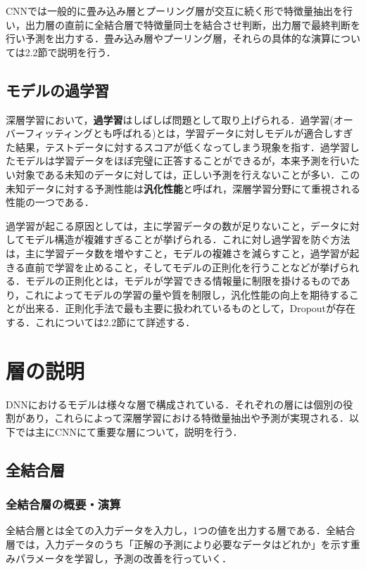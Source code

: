 \documentclass[a4j, 11pt]{jreport}
\begin{document}
CNNでは一般的に畳み込み層とプーリング層が交互に続く形で特徴量抽出を行い，出力層の直前に全結合層で特徴量同士を結合させ判断，出力層で最終判断を行い予測を出力する．畳み込み層やプーリング層，それらの具体的な演算については2.2節で説明を行う．

\subsection{モデルの過学習}
深層学習において，\textbf{過学習}はしばしば問題として取り上げられる．過学習(オーバーフィッティングとも呼ばれる)とは，学習データに対しモデルが適合しすぎた結果，テストデータに対するスコアが低くなってしまう現象を指す．過学習したモデルは学習データをほぼ完璧に正答することができるが，本来予測を行いたい対象である未知のデータに対しては，正しい予測を行えないことが多い．この未知データに対する予測性能は\textbf{汎化性能}と呼ばれ，深層学習分野にて重視される性能の一つである．

過学習が起こる原因としては，主に学習データの数が足りないこと，データに対してモデル構造が複雑すぎることが挙げられる．これに対し過学習を防ぐ方法は，主に学習データ数を増やすこと，モデルの複雑さを減らすこと，過学習が起きる直前で学習を止めること，そしてモデルの正則化を行うことなどが挙げられる．モデルの正則化とは，モデルが学習できる情報量に制限を掛けるものであり，これによってモデルの学習の量や質を制限し，汎化性能の向上を期待することが出来る．正則化手法で最も主要に扱われているものとして，Dropout\cite{Srivastava2014}が存在する．これについては2.2節にて詳述する．




\newpage
\section{層の説明}
DNNにおけるモデルは様々な層で構成されている．それぞれの層には個別の役割があり，これらによって深層学習における特徴量抽出や予測が実現される．以下では主にCNNにて重要な層について，説明を行う．
\subsection{全結合層}
\subsubsection{全結合層の概要・演算}
全結合層とは全ての入力データを入力し，1つの値を出力する層である．全結合層では，入力データのうち「正解の予測により必要なデータはどれか」を示す重みパラメータを学習し，予測の改善を行っていく．
\end{document}
